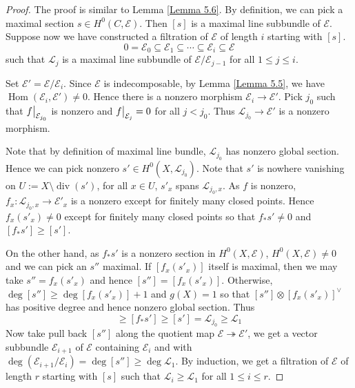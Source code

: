 \documentclass{ctexart}
\renewcommand{\hom}{\operatorname{Hom}}
\newcommand{\divisor}{\operatorname{div}}
\begin{document}
\begin{proof}
    The proof is similar to Lemma \ref{Lemma 5.6}.
    By definition, we can pick a maximal section $s\in H^{0}(C, \mathcal{E})$.
    Then $[s]$ is a maximal line subbundle of $\mathcal{E}$.
    Suppose now we have constructed a filtration of $\mathcal{E}$ of length $i$ starting with $[s]$.
    \begin{equation}
        0 = \mathcal{E}_{0} \subseteq \mathcal{E}_{1} \subseteq \cdots \subseteq \mathcal{E}_{i} \subseteq \mathcal{E}
    \end{equation}
    such that $\mathcal{L}_{j}$ is a maximal line subbundle of $\mathcal{E}/\mathcal{E}_{j - 1}$ for all $1 \le j \le i$.
    \par
    Set $\mathcal{E}' = \mathcal{E}/\mathcal{E}_{i}$.
    Since $\mathcal{E}$ is indecomposable, by Lemma \ref{Lemma 5.5}, we have $\hom(\mathcal{E}_{i}, \mathcal{E}') \neq 0$.
    Hence there is a nonzero morphism $\mathcal{E}_{i} \rightarrow \mathcal{E}'$.
    Pick $j_{0}$ such that $f\big{|}_{\mathcal{E}_{j_{0}}}$ is nonzero and $f\big{|}_{\mathcal{E}_{j}} = 0$ for all $j < j_{0}$.
    Thus $\mathcal{L}_{j_{0}} \rightarrow \mathcal{E}'$ is a nonzero morphism.
    \par
    Note that by definition of maximal line bundle, $\mathcal{L}_{j_{0}}$ has nonzero global section.
    Hence we can pick nonzero $s'\in H^{0}(X, \mathcal{L}_{j_{0}})$.
    Note that $s'$ is nowhere vanishing on $U := X \setminus \divisor (s')$,
    for all $x \in U$, $s'_{x}$ spans $\mathcal{L}_{j_{0}, x}$.
    As $f$ is nonzero, $f_{x}: \mathcal{L}_{j_{0}, x} \rightarrow \mathcal{E}'_{x}$ is a nonzero except for finitely many closed points.
    Hence $f_{x}(s'_{x}) \neq 0$ except for finitely many closed points so that $f_{\ast}s' \neq 0$ and $[f_{\ast}s'] \ge [s']$.
    \par
    On the other hand, as $f_{\ast}s'$ is a nonzero section in $H^{0}(X, \mathcal{E})$, $H^{0}(X, \mathcal{E}) \neq 0$ and we can pick an $s''$ maximal.
    If $[f_{x}(s'_{x})]$ itself is maximal, then we may take $s'' = f_{x}(s'_{x})$ and hence $[s''] = [f_{x}(s'_{x})]$.
    Otherwise, $\deg [s''] \ge \deg [f_{x}(s'_{x})] + 1$ and $g(X) = 1$ so that $[s''] \otimes [f_{x}(s'_{x})]^{\vee}$ has positive degree and hence nonzero global section.
    Thus
    \begin{equation}
        [s''] \ge [f_{\ast}s'] \ge [s'] = \mathcal{L}_{j_{0}} \ge \mathcal{L}_{1}
    \end{equation}
    Now take pull back $[s'']$ along the quotient map $\mathcal{E} \twoheadrightarrow \mathcal{E}'$, we get a vector subbundle $\mathcal{E}_{i + 1}$ of $\mathcal{E}$ containing $\mathcal{E}_{i}$ and with $\deg (\mathcal{E}_{i + 1}/\mathcal{E}_{i}) = \deg [s''] \ge \deg \mathcal{L}_{1}$.
    By induction, we get a filtration of $\mathcal{E}$ of length $r$ starting with $[s]$ such that $\mathcal{L}_{i} \ge \mathcal{L}_{1}$ for all $1 \le i \le r$.
\end{proof}
\end{document}
